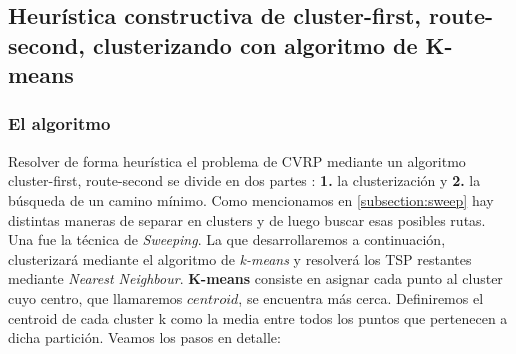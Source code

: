 \subsection{Heurística constructiva de cluster-first, route-second, clusterizando con algoritmo de K-means}
\subsubsection{El algoritmo}
Resolver de forma heurística el problema de CVRP mediante un algoritmo cluster-first, route-second se divide en dos partes : \textbf{1.} la clusterización y \textbf{2.} la búsqueda de un camino mínimo. Como mencionamos en \ref{subsection:sweep} hay distintas maneras de separar en clusters y de luego buscar esas posibles rutas. Una fue la técnica de \textit{Sweeping}. La que desarrollaremos a continuación, clusterizará mediante el algoritmo de \textit{k-means} y resolverá los TSP restantes mediante \textit{Nearest Neighbour}.
\textbf{K-means} consiste en asignar cada punto al cluster cuyo centro, que llamaremos $centroid$, se encuentra más cerca. Definiremos el centroid de cada cluster k como la media entre todos los puntos que pertenecen a dicha partición. Veamos los pasos en detalle:

